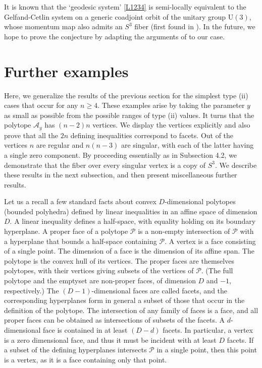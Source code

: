 \documentclass[a4paper,11pt,reqno]{amsart}
\theoremstyle{definition}
\numberwithin{equation}{section}
\def\cA{{\mathcal A}}                       %
\def\cP{{\mathcal P}}                       %
\begin{document}
It is known \cite{Al,BMZ} that the `geodesic system' \eqref{L1234} is semi-locally equivalent to the
 Gelfand-Cetlin system on a generic coadjoint orbit of the unitary group ${\mathrm{U}}(3)$, whose momentum map also admits
 an $S^3$ fiber (first found in \cite{NNU}).
 In the future, we hope to prove the conjecture by adapting the arguments of \cite{Al} to our case.


\section{Further examples}\label{Sec5}

Here, we generalize
the results of the previous section for the simplest type (ii) cases that occur for any $n\geq 4$.
These examples arise by taking the parameter $y$ as small as possible from the possible ranges of type (ii) values.
It turns that the polytope $\cA_y$ has $(n-2)n$ vertices.  We display the vertices  explicitly and also prove that all
the $2n$ defining inequalities correspond to facets.
Out of the vertices $n$ are regular and $n(n-3)$ are singular, with each of the latter having a single zero component.
By proceeding essentially as in Subsection 4.2, we  demonstrate that the fiber over every singular vertex
is a copy of $S^3$.
 We describe these results in the next subsection, and then present
 miscellaneous  further results.

 Let us a recall a few standard facts \cite{Br,PV,Z} about convex $D$-dimensional  polytopes (bounded polyhedra)
 defined by linear inequalities in an affine space of
 dimension $D$.
 A linear inequality defines a half-space, with equality holding on its boundary hyperplane.
  A proper face of a polytope $\cP$  is a non-empty intersection of $\cP$ with a hyperplane
 that bounds a half-space containing  $\cP$.
 A vertex is a face consisting of a single point.
  The dimension of a face is the dimension of its affine span.
 The polytope is the convex hull of its vertices.
 The proper faces are themselves polytopes, with their vertices giving subsets of the vertices of $\cP$.
 (The full polytope and the emptyset are non-proper faces, of dimension $D$ and $-1$, respectively.)
 The $(D-1)$-dimensional faces are called facets, and the corresponding hyperplanes form in general a subset of
 those that occur in the definition of the polytope.
 The intersection of any family of faces is a face, and all proper faces can be obtained as intersections of subsets of the facets.
 A $d$-dimensional face is contained in at least $(D-d)$ facets. In particular, a vertex is a zero dimensional face,
 and  thus it must be incident with at least $D$ facets.
 If a subset of the defining hyperplanes intersects $\cP$ in a single point, then this point
 is a vertex, as it is a face containing only that point.
\end{document}
